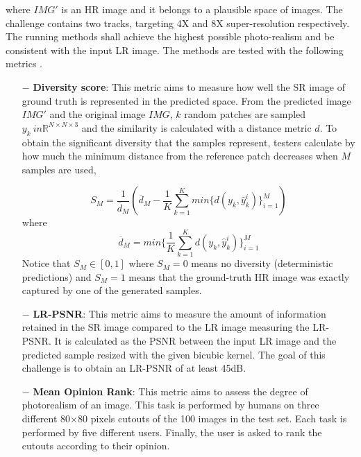 \documentclass{article}
\begin{document}
\noindent where $IMG'$ is an HR image and it belongs to a plausible space of images. The challenge contains two tracks, targeting 4X and 8X super-resolution respectively. The running methods shall achieve the highest possible photo-realism and be consistent with the input LR image. The methods are tested with the following metrics \cite{ntire21}. %
\begin{itemize}
    \item[$-$] \textbf{Diversity score}: This metric aims to measure how well the SR image of ground truth is represented in the predicted space. From the predicted image $IMG'$ and the original image $IMG$, $k$ random patches are sampled $y_k \ in \mathbb{R}^{N \times N \times 3}$ and the similarity is calculated with a distance metric $d$.  To obtain the significant diversity that the samples represent, testers calculate by how much the minimum distance from the reference patch decreases when $M$ samples are used,

    \begin{equation}
        S_M = \frac{1}{\overline{d}_M}(\overline{d}_M - \frac{1}{K}\sum^K_{k=1} min\{d(y_k, \hat{y}_k^i)\}^M_{i=1})
    \end{equation}
    where 
    \begin{equation}
        \overline{d}_M = min \{\frac{1}{K}\sum^K_{k=1}d(y_k, \hat{y}_k^i)\}^M_{i=1}
    \end{equation}
    Notice that $S_M \in [0,1]$ where $S_M=0$ means no diversity (deterministic predictions) and $S_M=1$ means
    that the ground-truth HR image was exactly captured by one of the generated samples.

    \item[$-$] \textbf{LR-PSNR}: This metric aims to measure the amount of information retained in the SR image compared to the LR image measuring the LR-PSNR. It is calculated as the PSNR between the input LR image and the predicted sample resized with the given bicubic kernel. The goal of this challenge is to obtain an LR-PSNR of at least 45dB.

    \item[$-$] \textbf{Mean Opinion Rank}: This metric aims to assess the degree of photorealism of an image. This task is performed by humans on three different 80$\times$80 pixels cutouts of the 100 images in the test set. Each task is performed by five different users. Finally, the user is asked to rank the cutouts according to their opinion.
\end{itemize}
\end{document}

